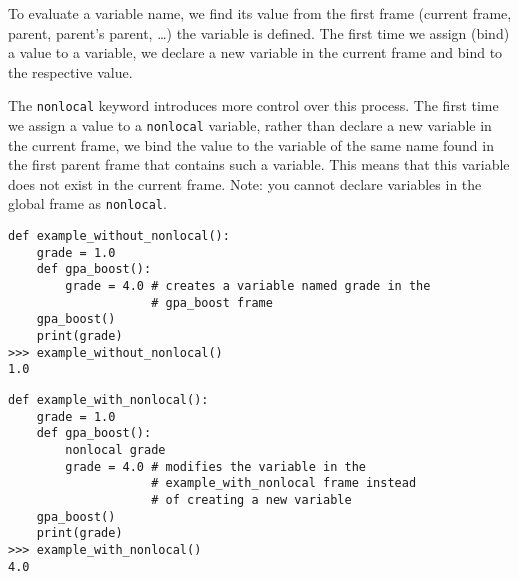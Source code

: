 To evaluate a variable name, we find its value from the first frame (current frame, parent, parent’s parent, …) the variable is defined. The first time we assign (bind) a value to a variable, we declare a new variable in the current frame and bind to the respective value.

The \lstinline{nonlocal} keyword introduces more control over this process. The first time we assign a value to a \lstinline{nonlocal} variable, rather than declare a new variable in the current frame, we bind the value to the variable of the same name found in the first parent frame that contains such a variable. This means that this variable does not exist in the current frame. Note: you cannot declare variables in the global frame as \lstinline{nonlocal}.
\newline
\begin{lstlisting}
def example_without_nonlocal():
    grade = 1.0
    def gpa_boost():
        grade = 4.0 # creates a variable named grade in the 
                    # gpa_boost frame
    gpa_boost()
    print(grade)
>>> example_without_nonlocal()
1.0
\end{lstlisting}
\pagebreak
\begin{lstlisting}
def example_with_nonlocal():
    grade = 1.0
    def gpa_boost():
        nonlocal grade
        grade = 4.0 # modifies the variable in the
                    # example_with_nonlocal frame instead
                    # of creating a new variable
    gpa_boost()
    print(grade)
>>> example_with_nonlocal()
4.0
\end{lstlisting}